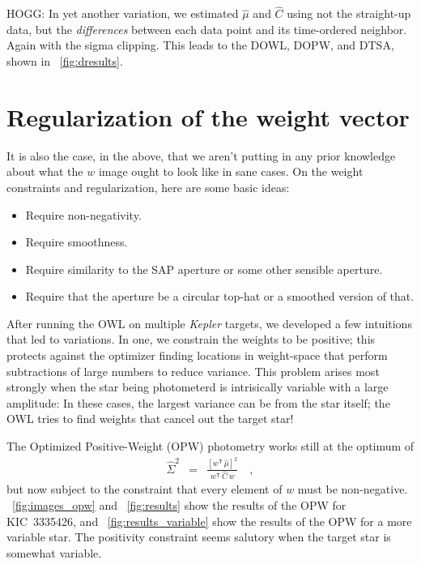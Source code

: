 \documentclass[12pt, letterpaper, preprint]{aastex}
\newcommand{\project}[1]{\textsl{#1}}
\newcommand{\transpose}[1]{{#1}^{\!\mathsf T}}
\begin{document}
HOGG:
In yet another variation, we estimated $\hat{\mu}$ and $\hat{C}$ using not the
  straight-up data, but the \emph{differences} between each data point and
  its time-ordered neighbor.
Again with the sigma clipping.
This leads to the DOWL, DOPW, and DTSA, shown in \figurename~\ref{fig:dresults}.

\section{Regularization of the weight vector}

It is also the case, in the above, that
  we aren't putting in any prior knowledge about what the $w$ image ought to look like
  in sane cases.
On the weight constraints and regularization, here are some basic ideas:
\begin{itemize}
\item
Require non-negativity.
\item
Require smoothness.
\item
Require similarity to the SAP aperture or some other sensible aperture.
\item
Require that the aperture be a circular top-hat or a smoothed version of that.
\end{itemize}

After running the OWL on multiple \project{Kepler} targets,
  we developed a few intuitions that led to variations.
In one, we constrain the weights to be positive;
  this protects against the optimizer finding locations in weight-space
  that perform subtractions of large numbers to reduce variance.
This problem arises most strongly when the star being photometerd is intrisically variable
  with a large amplitude:
In these cases, the largest variance can be from the star itself;
  the OWL tries to find weights that cancel out the target star!

The Optimized Positive-Weight (OPW) photometry works still at the optimum of
\begin{eqnarray}
\hat{\Sigma}^2 &=& \frac{[\transpose{w}\, \hat{\mu}]^2}{\transpose{w}\, \hat{C}\, w}
\quad ,
\end{eqnarray}
but now subject to the constraint that every element of $w$ must be non-negative.
\figurename~\ref{fig:images_opw} and \figurename~\ref{fig:results}
 show the results of the OPW for KIC~3335426,
 and \figurename~\ref{fig:results_variable} show the results of the OPW
 for a more variable star.
The positivity constraint seems salutory when the target star is somewhat variable.
\end{document}

